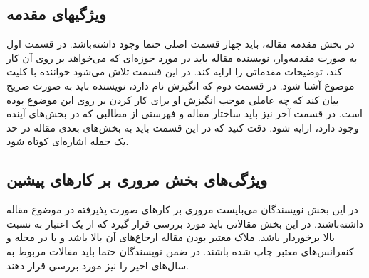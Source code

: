 \documentclass{CCI2020}
\begin{document}
\subsection{ویژگی­های مقدمه}
\label{IntroMainFeat}
در بخش مقدمه مقاله، باید چهار قسمت اصلی حتما وجود داشته‌باشد. در قسمت اول به صورت مقدمه‌وار، نویسنده مقاله باید در مورد حوزه‌ای که می‌خواهد بر روی آن کار کند، توضیحات مقدماتی را ارایه کند. در این قسمت تلاش می‌شود خواننده با کلیت موضوع آشنا شود. در قسمت دوم که انگیزش نام دارد، نویسنده باید به صورت صریح بیان کند که چه عاملی موجب انگیزش او برای کار کردن بر روی این موضوع بوده است. 
در قسمت آخر نیز باید ساختار مقاله و فهرستی از مطالبی که در بخش‌های آینده وجود دارد، ارایه شود. دقت کنید که در این قسمت باید به بخش‌های بعدی مقاله در حد یک جمله اشاره‌ای کوتاه شود.

\subsection{ویژگی‌های بخش مروری بر کارهای پیشین}
در این بخش نویسندگان می‌بایست مروری بر کارهای صورت پذیرفته در موضوع مقاله داشته‌باشند. در این بخش مقالاتی باید مورد بررسی قرار گیرد که از یک اعتبار به نسبت بالا برخوردار باشد.  ملاک معتبر بودن مقاله ارجاع‌های آن بالا باشد و یا در مجله و کنفرانس‌های معتبر چاپ شده باشند.  در ضمن نویسندگان حتما باید مقالات مربوط به سال‌های اخیر را نیز مورد بررسی قرار دهند. 

\end{document}
